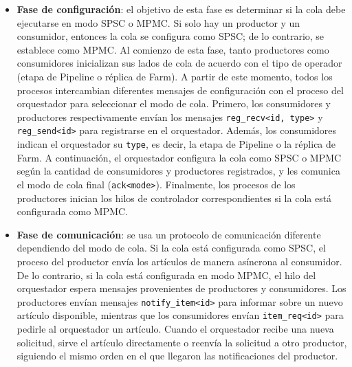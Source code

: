 \begin{itemize}
\item \textbf{Fase de configuración}: el objetivo de esta fase es determinar si la cola debe ejecutarse en modo SPSC o MPMC. Si solo hay un productor y un consumidor, entonces la cola se configura como SPSC; de lo contrario, se establece como MPMC. Al comienzo de esta fase, tanto productores como consumidores inicializan sus lados de cola de acuerdo con el tipo de operador (etapa de Pipeline o réplica de Farm). A partir de este momento, todos los procesos intercambian diferentes mensajes de configuración con el proceso del orquestador para seleccionar el modo de cola. Primero, los consumidores y productores respectivamente envían los mensajes \texttt{reg\_recv<id, type>} y \texttt{reg\_send<id>} para registrarse en el orquestador. Además, los consumidores indican el orquestador su \texttt{type}, es decir, la etapa de Pipeline o la réplica de Farm. A continuación, el orquestador configura la cola como SPSC o MPMC según la cantidad de consumidores y productores registrados, y les comunica el modo de cola final (\texttt{ack<mode>}). Finalmente, los procesos de los productores inician los hilos de controlador correspondientes si la cola está configurada como MPMC.

\item \textbf{Fase de comunicación}: se usa un protocolo de comunicación diferente dependiendo del modo de cola. Si la cola está configurada como SPSC, el proceso del productor envía los artículos de manera asíncrona al consumidor. De lo contrario, si la cola está configurada en modo MPMC, el hilo del orquestador espera mensajes provenientes de productores y consumidores. Los productores envían mensajes \texttt{notify\_item<id>} para informar sobre un nuevo artículo disponible, mientras que los consumidores envían \texttt{item\_req<id>} para pedirle al orquestador un artículo. Cuando el orquestador recibe una nueva solicitud, sirve el artículo directamente o reenvía la solicitud a otro productor, siguiendo el mismo orden en el que llegaron las notificaciones del productor.


\end{itemize}
